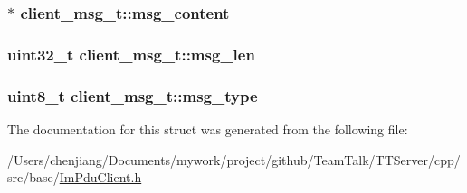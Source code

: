 \subsubsection[{msg\+\_\+content}]{$\ast$ client\+\_\+msg\+\_\+t\+::msg\+\_\+content}\label{structclient__msg__t_a8e9c6d5cf95eb4aafb6b1985f33c1c3f}
\hypertarget{structclient__msg__t_aa3780ae7f4ffc9a99514d644d1a85091}{}
\subsubsection[{msg\+\_\+len}]{\setlength{\rightskip}{0pt plus 5cm}uint32\+\_\+t client\+\_\+msg\+\_\+t\+::msg\+\_\+len}\label{structclient__msg__t_aa3780ae7f4ffc9a99514d644d1a85091}
\hypertarget{structclient__msg__t_a2e29ac505ddff6b2fd10b75cb94118cd}{}
\subsubsection[{msg\+\_\+type}]{\setlength{\rightskip}{0pt plus 5cm}uint8\+\_\+t client\+\_\+msg\+\_\+t\+::msg\+\_\+type}\label{structclient__msg__t_a2e29ac505ddff6b2fd10b75cb94118cd}


The documentation for this struct was generated from the following file\+:\begin{DoxyCompactItemize}
\item 
/\+Users/chenjiang/\+Documents/mywork/project/github/\+Team\+Talk/\+T\+T\+Server/cpp/src/base/\hyperlink{_im_pdu_client_8h}{Im\+Pdu\+Client.\+h}\end{DoxyCompactItemize}

